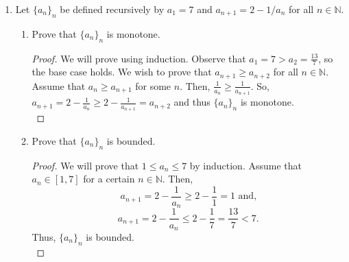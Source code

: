 \documentclass{article}
\begin{document}
\begin{enumerate}
\begin{enumerate}
                \item Prove that the sequence is unbounded.
                    \begin{proof}
                        We will prove by contradiction. Assume that $\{a_n\}_n$ is bounded. Then by the monotone convergence theorem, $a_n$ converges to $L \in \mathbb{R}$. Passing at the limit with $n \to \infty$ in $a_{n+1} = a_n+\frac{1}{a_n}$, we get $L=L+\frac{1}{L}$. So $\frac{1}{L} = 0$ and $L = \infty$. This is a contradiction, so $\{a_n\}_n$ is unbounded.\\
                    \end{proof}
                
            \end{enumerate}

        \item  Let $\{a_n\}_n$ be defined recursively by $a_1 = 7$ and $a_{n+1} = 2-1/a_n$ for all $n \in \mathbb{N}$.
            \begin{enumerate}
                \item Prove that $\{a_n\}_n$ is monotone.
                    \begin{proof}
                        We will prove using induction. Observe that $a_1 = 7 > a_2 = \frac{13}{7}$, so the base case holds. We wish to prove that $a_{n+1} \geq a_{n+2}$ for all $n \in \mathbb{N}$. Assume that $a_n \geq a_{n+1}$ for some $n$. Then, $\frac{1}{a_n} \geq \frac{1}{a_{n+1}}$. So, $a_{n+1} = 2-\frac{1}{a_n} \geq 2-\frac{1}{a_{n+1}} = a_{n+2}$ and thus $\{a_n\}_n$ is monotone.\\
                    \end{proof}
                
                \item Prove that $\{a_n\}_n$ is bounded.
                    \begin{proof}
                        We will prove that $1 \leq a_n \leq 7$ by induction. Assume that $a_n \in [1,7]$ for a certain $n \in \mathbb{N}$. Then, 
                            \[a_{n+1} = 2 - \frac{1}{a_n} \geq 2-\frac{1}{1} = 1 \text{ and,}\]
                            \[a_{n+1} = 2-\frac{1}{a_n} \leq 2-\frac{1}{7} = \frac{13}{7} < 7.\]
                        Thus, $\{a_n\}_n$ is bounded.\\
                    \end{proof}
                

\end{enumerate}
\end{enumerate}
\end{document}
